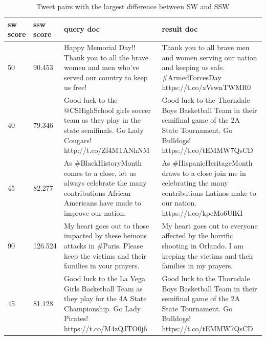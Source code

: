 \begin{table}[]
\tiny
\centering
\caption{Tweet pairs with the largest difference between SW and SSW}
\label{tbl:diff}
\begin{tabular}{|p{}|p{}|p{}|p{}|}
\hline
sw score & ssw score                   & query doc                                                                                                                                               & result doc                                                                                                                                          \\ \hline
50       & 90.453                      & Happy Memorial Day!! Thank you to all the brave women and men who've served our country to keep us free!                                                & Thank you to all brave men and women serving our nation and keeping us safe. \#ArmedForcesDay https://t.co/xVswnTWMR0                               \\ \hline
40       & 79.346 &Good luck to the @CSHighSchool girls soccer team as they play in the state semifinals. Go Lady Cougars! http://t.co/Zf4MTANhNM     & Good luck to the Thorndale Boys Basketball Team in their semifinal game of the 2A State Tournament. Go Bulldogs! https://t.co/tEMMW7QsCD            \\ \hline
45       & 82.277                      & As \#BlackHistoryMonth comes to a close, let us always celebrate the many contributions African Americans have made to improve our nation.              & As \#HispanicHeritageMonth draws to a close join me in celebrating the many contributions Latinos make to our nation. https://t.co/kpeMo6UlKI       \\ \hline
90       & 126.524                     & My heart goes out to those impacted by these heinous attacks in \#Paris. Please keep the victims and their families in your prayers.                    & My heart goes out to everyone affected by the horrific shooting in Orlando. I am keeping the victims and their families in my prayers.              \\ \hline
45       & 81.128                      & Good luck to the La Vega Girls Basketball Team as they play for the 4A State Championship. Go Lady Pirates! https://t.co/M4zQJTO0j6                     & Good luck to the Thorndale Boys Basketball Team in their semifinal game of the 2A State Tournament. Go Bulldogs! https://t.co/tEMMW7QsCD            \\ \hline

\end{tabular}
\end{table}
